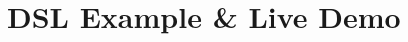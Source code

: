 \documentclass[10pt]{beamer}
\begin{document}




\section{DSL Example \& Live Demo}
\end{document}
